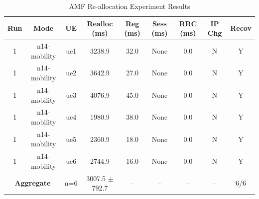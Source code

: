 \begin{table}[ht]
\centering
\begin{tabular}{|c|c|c|c|c|c|c|c|c|}
\hline
Run & Mode & UE & Realloc (ms) & Reg (ms) & Sess (ms) & RRC (ms) & IP Chg & Recov \\
\hline
1 & n14-mobility & ue1 & 3238.9 & 32.0 & None & 0.0 & N & Y \\
1 & n14-mobility & ue2 & 3642.9 & 27.0 & None & 0.0 & N & Y \\
1 & n14-mobility & ue3 & 4076.9 & 45.0 & None & 0.0 & N & Y \\
1 & n14-mobility & ue4 & 1980.9 & 38.0 & None & 0.0 & N & Y \\
1 & n14-mobility & ue5 & 2360.9 & 18.0 & None & 0.0 & N & Y \\
1 & n14-mobility & ue6 & 2744.9 & 16.0 & None & 0.0 & N & Y \\
\multicolumn{2}{|c|}{\textbf{Aggregate}} & n=6 & 3007.5 $\pm$ 792.7 & -- & -- & -- & -- & 6/6 \\
\hline
\end{tabular}
\caption{AMF Re-allocation Experiment Results}
\label{tab:amf_realloc}
\end{table}
